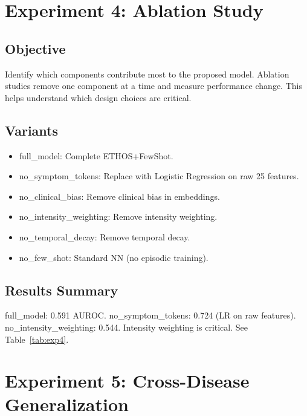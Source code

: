 \section{Experiment 4: Ablation Study}

\subsection{Objective}

Identify which components contribute most to the proposed model. Ablation studies remove one component at a time and measure performance change. This helps understand which design choices are critical.

\subsection{Variants}

\begin{itemize}
\item full\_model: Complete ETHOS+FewShot.
\item no\_symptom\_tokens: Replace with Logistic Regression on raw 25 features.
\item no\_clinical\_bias: Remove clinical bias in embeddings.
\item no\_intensity\_weighting: Remove intensity weighting.
\item no\_temporal\_decay: Remove temporal decay.
\item no\_few\_shot: Standard NN (no episodic training).
\end{itemize}

\subsection{Results Summary}

full\_model: 0.591 AUROC. no\_symptom\_tokens: 0.724 (LR on raw features). no\_intensity\_weighting: 0.544. Intensity weighting is critical. See Table~\ref{tab:exp4}.

\section{Experiment 5: Cross-Disease Generalization}

